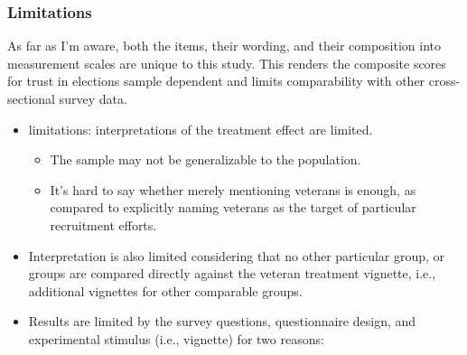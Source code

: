 \documentclass[
  12pt,
  letterpaper,
]{article}
\providecommand{\tightlist}{%
  \setlength{\itemsep}{0pt}\setlength{\parskip}{0pt}}\usepackage{longtable,booktabs,array}
\begin{document}
\subsubsection{Limitations}\label{limitations}

As far as I'm aware, both the items, their wording, and their
composition into measurement scales are unique to this study. This
renders the composite scores for trust in elections sample dependent and
limits comparability with other cross-sectional survey data.

\begin{itemize}
\tightlist
\item
  limitations: interpretations of the treatment effect are limited.

  \begin{itemize}
  \tightlist
  \item
    The sample may not be generalizable to the population.
  \item
    It's hard to say whether merely mentioning veterans is enough, as
    compared to explicitly naming veterans as the target of particular
    recruitment efforts.
  \end{itemize}
\item
  Interpretation is also limited considering that no other particular
  group, or groups are compared directly against the veteran treatment
  vignette, i.e., additional vignettes for other comparable groups.
\item
  Results are limited by the survey questions, questionnaire design, and
  experimental stimulus (i.e., vignette) for two reasons:


\end{itemize}
\end{document}
